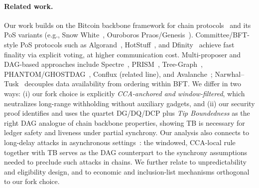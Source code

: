 \paragraph{Related work.} 
Our work builds on the Bitcoin backbone framework for chain protocols~\cite{EC:GarKiaLeo15} and its PoS variants (e.g., Snow White~\cite{FC:DaiPasShi19}, Ouroboros Praos/Genesis~\cite{EC:DGKR18,CCS:BGKRZ18}). Committee/BFT-style PoS protocols such as Algorand~\cite{Algorand}, HotStuff~\cite{HotStuff}, and Dfinity~\cite{Dfinity} achieve fast finality via explicit voting, at higher communication cost. Multi-proposer and DAG-based approaches include Spectre~\cite{EPRINT:MorKulYok18}, PRISM~\cite{Prism}, Tree-Graph~\cite{EPRINT:ZhaChaLeo18}, PHANTOM/GHOSTDAG~\cite{AFT:SWZ21}, Conflux (related line), and Avalanche~\cite{SnowFamily}; Narwhal–Tusk~\cite{NarwhalTusk} decouples data availability from ordering within BFT. We differ in two ways: (i) our fork choice is explicitly \emph{CCA-anchored and window-filtered}, which neutralizes long-range withholding without auxiliary gadgets, and (ii) our security proof identifies and uses the quartet DG/DQ/DCP plus \emph{Tip Boundedness} as the right DAG analogue of chain backbone properties, showing TB is necessary for ledger safety and liveness under partial synchrony. Our analysis also connects to long-delay attacks in asynchronous settings~\cite{EC:PasSeeShe17}: the windowed, CCA-local rule together with TB serves as the DAG counterpart to the synchrony assumptions needed to preclude such attacks in chains. We further relate to unpredictability and eligibility design, and to economic and inclusion-list mechanisms orthogonal to our fork choice.
